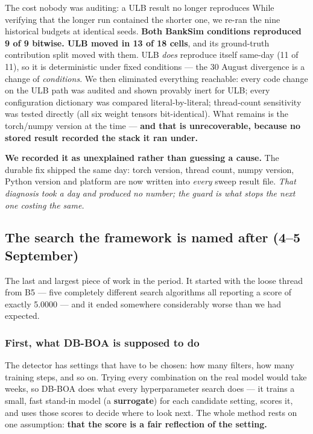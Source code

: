\documentclass[11pt]{article}
\begin{document}
\begin{warnbox}{The cost nobody was auditing: a ULB result no longer reproduces}
While verifying that the longer run contained the shorter one, we re-ran the nine historical budgets at
identical seeds. \textbf{Both BankSim conditions reproduced 9 of 9 bitwise. ULB moved in 13 of 18
cells}, and its ground-truth contribution split moved with them. ULB \emph{does} reproduce itself
same-day (11 of 11), so it is deterministic under fixed conditions --- the 30 August divergence is a
change of \emph{conditions}. We then eliminated everything reachable: every code change on the ULB path
was audited and shown provably inert for ULB; every configuration dictionary was compared
literal-by-literal; thread-count sensitivity was tested directly (all six weight tensors bit-identical).
What remains is the torch/numpy version at the time --- \textbf{and that is unrecoverable, because no
stored result recorded the stack it ran under.}

\textbf{We recorded it as unexplained rather than guessing a cause.} The durable fix shipped the same
day: torch version, thread count, numpy version, Python version and platform are now written into
\emph{every} sweep result file. \emph{That diagnosis took a day and produced no number; the guard is
what stops the next one costing the same.}
\end{warnbox}

\subsection{The search the framework is named after (4--5 September)}
\label{sec:obj13}

The last and largest piece of work in the period. It started with the loose thread from B5 --- five
completely different search algorithms all reporting a score of exactly 5.0000 --- and it ended
somewhere considerably worse than we had expected.

\subsubsection*{First, what DB-BOA is supposed to do} The detector has settings that have to be chosen:
how many filters, how many training steps, and so on. Trying every combination on the real model would
take weeks, so DB-BOA does what every hyperparameter search does --- it trains a small, fast stand-in
model (a \textbf{surrogate}) for each candidate setting, scores it, and uses those scores to decide
where to look next. The whole method rests on one assumption: \textbf{that the score is a fair
reflection of the setting.}
\end{document}
